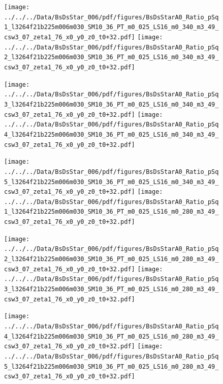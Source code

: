 \documentclass[a4paper,10pt]{article}
\begin{document}
\begin{figure}[p]
 \texttt{[image: ../../../Data/BsDsStar\_006/pdf/figures/BsDsStarA0\_Ratio\_pSq1\_l3264f21b225m006m030\_SM10\_36\_PT\_m0\_025\_LS16\_m0\_340\_m3\_49\_csw3\_07\_zeta1\_76\_x0\_y0\_z0\_t0+32.pdf]} 
 \texttt{[image: ../../../Data/BsDsStar\_006/pdf/figures/BsDsStarA0\_Ratio\_pSq2\_l3264f21b225m006m030\_SM10\_36\_PT\_m0\_025\_LS16\_m0\_340\_m3\_49\_csw3\_07\_zeta1\_76\_x0\_y0\_z0\_t0+32.pdf]} 
 \end{figure}
\begin{figure}[p]
 \texttt{[image: ../../../Data/BsDsStar\_006/pdf/figures/BsDsStarA0\_Ratio\_pSq3\_l3264f21b225m006m030\_SM10\_36\_PT\_m0\_025\_LS16\_m0\_340\_m3\_49\_csw3\_07\_zeta1\_76\_x0\_y0\_z0\_t0+32.pdf]} 
 \texttt{[image: ../../../Data/BsDsStar\_006/pdf/figures/BsDsStarA0\_Ratio\_pSq4\_l3264f21b225m006m030\_SM10\_36\_PT\_m0\_025\_LS16\_m0\_340\_m3\_49\_csw3\_07\_zeta1\_76\_x0\_y0\_z0\_t0+32.pdf]} 
 \end{figure}
\begin{figure}[p]
 \texttt{[image: ../../../Data/BsDsStar\_006/pdf/figures/BsDsStarA0\_Ratio\_pSq5\_l3264f21b225m006m030\_SM10\_36\_PT\_m0\_025\_LS16\_m0\_340\_m3\_49\_csw3\_07\_zeta1\_76\_x0\_y0\_z0\_t0+32.pdf]} 
 \texttt{[image: ../../../Data/BsDsStar\_006/pdf/figures/BsDsStarA0\_Ratio\_pSq1\_l3264f21b225m006m030\_SM10\_36\_PT\_m0\_025\_LS16\_m0\_280\_m3\_49\_csw3\_07\_zeta1\_76\_x0\_y0\_z0\_t0+32.pdf]} 
 \end{figure}
\clearpage
\begin{figure}[p]
 \texttt{[image: ../../../Data/BsDsStar\_006/pdf/figures/BsDsStarA0\_Ratio\_pSq2\_l3264f21b225m006m030\_SM10\_36\_PT\_m0\_025\_LS16\_m0\_280\_m3\_49\_csw3\_07\_zeta1\_76\_x0\_y0\_z0\_t0+32.pdf]} 
 \texttt{[image: ../../../Data/BsDsStar\_006/pdf/figures/BsDsStarA0\_Ratio\_pSq3\_l3264f21b225m006m030\_SM10\_36\_PT\_m0\_025\_LS16\_m0\_280\_m3\_49\_csw3\_07\_zeta1\_76\_x0\_y0\_z0\_t0+32.pdf]} 
 \end{figure}
\begin{figure}[p]
 \texttt{[image: ../../../Data/BsDsStar\_006/pdf/figures/BsDsStarA0\_Ratio\_pSq4\_l3264f21b225m006m030\_SM10\_36\_PT\_m0\_025\_LS16\_m0\_280\_m3\_49\_csw3\_07\_zeta1\_76\_x0\_y0\_z0\_t0+32.pdf]} 
 \texttt{[image: ../../../Data/BsDsStar\_006/pdf/figures/BsDsStarA0\_Ratio\_pSq5\_l3264f21b225m006m030\_SM10\_36\_PT\_m0\_025\_LS16\_m0\_280\_m3\_49\_csw3\_07\_zeta1\_76\_x0\_y0\_z0\_t0+32.pdf]} 
 \end{figure}
\clearpage
\end{document}
